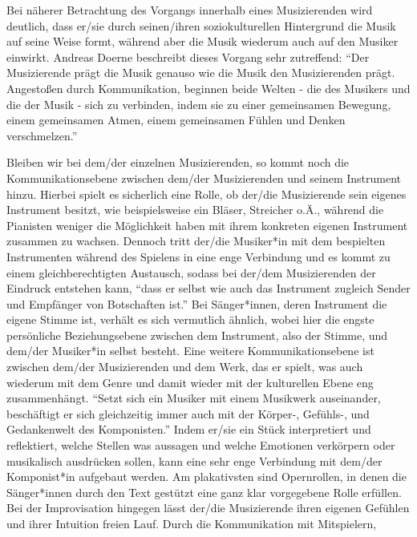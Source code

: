 Bei näherer Betrachtung des Vorgangs
innerhalb eines Musizierenden wird deutlich, dass er/sie durch seinen/ihren
soziokulturellen Hintergrund die Musik auf seine Weise formt, während aber
die Musik
wiederum auch auf den Musiker einwirkt. Andreas Doerne beschreibt dieses Vorgang
sehr zutreffend: \enquote{Der Musizierende prägt die Musik genauso wie die Musik
den Musizierenden prägt. Angestoßen durch Kommunikation, beginnen beide Welten -
die des Musikers und die der Musik - sich zu verbinden, indem sie zu einer
gemeinsamen Bewegung, einem gemeinsamen Atmen, einem gemeinsamen Fühlen und
Denken verschmelzen.} \autocite[60]{doerne:umfassend_musizieren}

Bleiben wir bei dem/der einzelnen Musizierenden, so kommt noch die
Kommunikationsebene zwischen dem/der Musizierenden und seinem Instrument hinzu.
Hierbei spielt es sicherlich eine Rolle, ob der/die Musizierende sein eigenes
Instrument besitzt, wie beispielsweise ein Bläser, Streicher o.Ä., während die
Pianisten weniger die Möglichkeit haben mit ihrem konkreten eigenen Instrument
zusammen zu wachsen. Dennoch tritt der/die Musiker*in mit dem bespielten
Instrumenten während des Spielens in eine enge Verbindung und es kommt zu einem
gleichberechtigten Austausch, sodass bei der/dem Musizierenden der Eindruck
entstehen kann, \enquote{dass er selbst wie auch das Instrument zugleich Sender
und Empfänger von Botschaften ist.} \autocite[59]{doerne:umfassend_musizieren}
Bei Sänger*innen, deren Instrument die eigene Stimme ist, verhält es sich
vermutlich ähnlich, wobei hier die engste persönliche Beziehungsebene zwischen
dem Instrument, also der Stimme, und dem/der Musiker*in selbst besteht. Eine
weitere Kommunikationsebene ist zwischen dem/der Musizierenden und dem Werk, das
er spielt, was auch wiederum mit dem Genre und damit wieder mit der kulturellen
Ebene eng zusammenhängt. \enquote{Setzt sich ein Musiker mit einem Musikwerk
auseinander, beschäftigt er sich gleichzeitig immer auch mit der Körper-,
Gefühls-, und Gedankenwelt des Komponisten.}
\autocite[59]{doerne:umfassend_musizieren} Indem er/sie ein Stück interpretiert
und reflektiert, welche Stellen was aussagen und welche Emotionen verkörpern
oder musikalisch ausdrücken sollen, kann eine sehr enge  Verbindung mit dem/der
Komponist*in aufgebaut werden. Am plakativsten sind Opernrollen, in denen die
Sänger*innen durch den Text gestützt eine ganz klar vorgegebene Rolle erfüllen.
Bei der Improvisation hingegen lässt der/die Musizierende ihren eigenen Gefühlen
und ihrer Intuition freien Lauf. Durch die Kommunikation mit Mitspielern,
